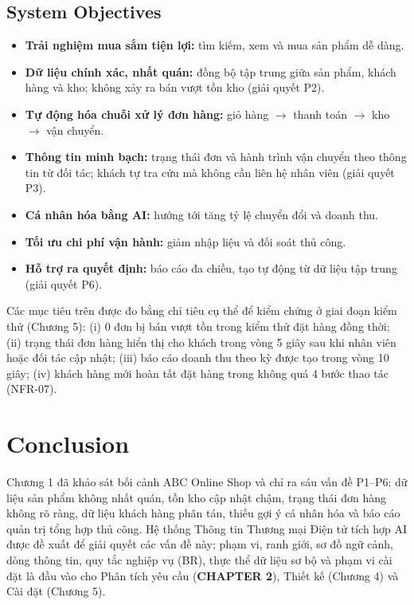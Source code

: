\documentclass[12pt,a4paper,oneside]{report}
\begin{document}
\subsection{System Objectives}

\begin{itemize}
  \item \textbf{Trải nghiệm mua sắm tiện lợi:} tìm kiếm, xem và mua sản phẩm dễ dàng.
  \item \textbf{Dữ liệu chính xác, nhất quán:} đồng bộ tập trung giữa sản phẩm, khách hàng và kho; không xảy ra bán vượt tồn kho (giải quyết P2).
  \item \textbf{Tự động hóa chuỗi xử lý đơn hàng:} giỏ hàng $\rightarrow$ thanh toán $\rightarrow$ kho $\rightarrow$ vận chuyển.
  \item \textbf{Thông tin minh bạch:} trạng thái đơn và hành trình vận chuyển theo thông tin từ đối tác; khách tự tra cứu mà không cần liên hệ nhân viên (giải quyết P3).
  \item \textbf{Cá nhân hóa bằng AI:} hướng tới tăng tỷ lệ chuyển đổi và doanh thu.
  \item \textbf{Tối ưu chi phí vận hành:} giảm nhập liệu và đối soát thủ công.
  \item \textbf{Hỗ trợ ra quyết định:} báo cáo đa chiều, tạo tự động từ dữ liệu tập trung (giải quyết P6).
\end{itemize}

Các mục tiêu trên được đo bằng chỉ tiêu cụ thể để kiểm chứng ở giai đoạn kiểm thử (Chương 5): (i) 0 đơn bị bán vượt tồn trong kiểm thử đặt hàng đồng thời; (ii) trạng thái đơn hàng hiển thị cho khách trong vòng 5 giây sau khi nhân viên hoặc đối tác cập nhật; (iii) báo cáo doanh thu theo kỳ được tạo trong vòng 10 giây; (iv) khách hàng mới hoàn tất đặt hàng trong không quá 4 bước thao tác (NFR-07).

\section{Conclusion}

Chương 1 đã khảo sát bối cảnh ABC Online Shop và chỉ ra sáu vấn đề P1--P6: dữ liệu sản phẩm không nhất quán, tồn kho cập nhật chậm, trạng thái đơn hàng không rõ ràng, dữ liệu khách hàng phân tán, thiếu gợi ý cá nhân hóa và báo cáo quản trị tổng hợp thủ công. Hệ thống Thông tin Thương mại Điện tử tích hợp AI được đề xuất để giải quyết các vấn đề này; phạm vi, ranh giới, sơ đồ ngữ cảnh, dòng thông tin, quy tắc nghiệp vụ (BR), thực thể dữ liệu sơ bộ và phạm vi cài đặt là đầu vào cho Phân tích yêu cầu (\textbf{CHAPTER 2}), Thiết kế (Chương 4) và Cài đặt (Chương 5).
\end{document}

